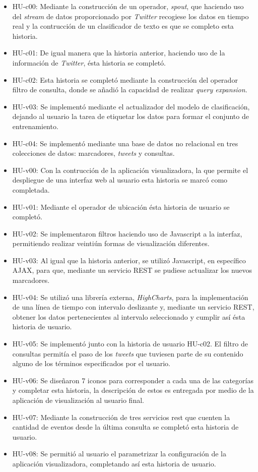\begin{itemize}
\item HU-c00: Mediante la construcción de un operador, \textit{spout}, que haciendo uso del \textit{stream} de datos proporcionado por \textit{Twitter} recogiese los datos en tiempo real y la contrucción de un clasificador de texto es que se completo esta historia.
\item HU-c01: De igual manera que la historia anterior, haciendo uso de la información de \textit{Twitter}, ésta historia se completó.
\item HU-c02: Esta historia se completó mediante la construcción del operador filtro de consulta, donde se añadió la capacidad de realizar \textit{query expansion}.
\item HU-v03: Se implementó mediante el actualizador del modelo de clasificación, dejando al usuario la tarea de etiquetar los datos para formar el conjunto de entrenamiento.
\item HU-c04: Se implementó mediante una base de datos no relacional en tres colecciones de datos: marcadores, \textit{tweets} y consultas.
\item HU-v00: Con la contrucción de la aplicación visualizadora, la que permite el despliegue de una interfaz web al usuario esta historia se marcó como completada.
\item HU-v01: Mediante el operador de ubicación ésta historia de usuario se completó.
\item HU-v02: Se implementaron filtros haciendo uso de Javascript a la interfaz, permitiendo realizar veintiún formas de visualización diferentes.
\item HU-v03: Al igual que la historia anterior, se utilizó Javascript, en específico AJAX, para que, mediante un servicio REST se pudiese actualizar los nuevos marcadores.
\item HU-v04: Se utilizó una librería externa, \textit{HighCharts}, para la implementación de una línea de tiempo con intervalo deslizante y, mediante un servicio REST, obtener los datos pertenecientes al intervalo seleccionado y cumplir así ésta historia de usuario.
\item HU-v05: Se implementó junto con la historia de usuario HU-c02. El filtro de consultas permitía el paso de los \textit{tweets} que tuviesen parte de su contenido alguno de los términos especificados por el usuario.
\item HU-v06: Se diseñaron 7 iconos para corresponder a cada una de las categorías y completar esta historia, la descripción de estos es entregada por medio de la aplicación de visualización al usuario final.
\item HU-v07: Mediante la construcción de tres servicios rest que cuenten la cantidad de eventos desde la última consulta se completó esta historia de usuario.
\item HU-v08: Se permitió al usuario el parametrizar la configuración de la aplicación visualizadora, completando así esta historia de usuario.
\end{itemize}

